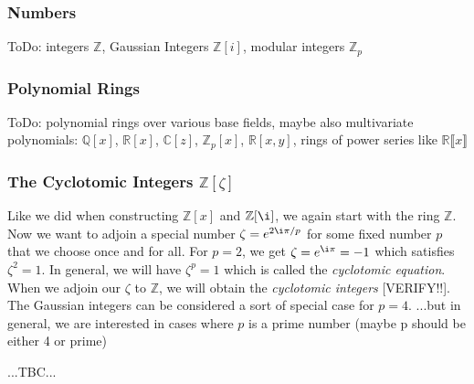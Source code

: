 \subsubsection{Numbers}
ToDo: integers $\mathbb{Z}$, Gaussian Integers $\mathbb{Z}[i]$, modular integers $\mathbb{Z}_p$

\subsubsection{Polynomial Rings}
ToDo: polynomial rings over various base fields, maybe also multivariate polynomials: $\mathbb{Q}[x]$, $\mathbb{R}[x]$, $\mathbb{C}[z]$, $\mathbb{Z}_p[x]$, $\mathbb{R}[x,y]$, rings of power series like
$\mathbb{R} \llbracket x \rrbracket$


\subsubsection{The Cyclotomic Integers $\mathbb{Z}[\zeta]$}
Like we did when constructing $\mathbb{Z}[x]$ and $\mathbb{Z}[\i]$, we again start with the ring $\mathbb{Z}$. Now we want to adjoin a special number $\zeta = e^{2 \i \pi / p}$ for some fixed number $p$ that we choose once and for all. For $p=2$, we get $\zeta = e^{\i \pi} = -1$ which satisfies $\zeta^2 = 1$. In general, we will have $\zeta^p = 1$ which is called the \emph{cyclotomic equation}. When we adjoin our $\zeta$ to $\mathbb{Z}$, we will obtain the \emph{cyclotomic integers} [VERIFY!!]. The Gaussian integers can be considered a sort of special case for $p=4$. ...but in general, we are interested in cases where $p$ is a prime number (maybe p should be either 4 or prime)

...TBC...





